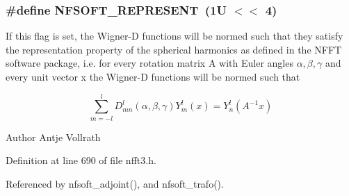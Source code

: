 \hypertarget{group__nfsoft_ga379d5bf88e399cf492d86090ce47d47d}{
\subsubsection[{N\-F\-S\-O\-F\-T\-\_\-\-R\-E\-P\-R\-E\-S\-E\-N\-T}]{\setlength{\rightskip}{0pt plus 5cm}\#define N\-F\-S\-O\-F\-T\-\_\-\-R\-E\-P\-R\-E\-S\-E\-N\-T~(1\-U $<$$<$ 4)}}\label{group__nfsoft_ga379d5bf88e399cf492d86090ce47d47d}
If this flag is set, the Wigner-\/\-D functions will be normed such that they satisfy the representation property of the spherical harmonics as defined in the N\-F\-F\-T software package, i.\-e. for every rotation matrix {\ttfamily A} with Euler angles $\alpha, \beta, \gamma$ and every unit vector {\ttfamily x} the Wigner-\/\-D functions will be normed such that

\[ \sum_{m=-l}^l D_{mn}^l(\alpha,\beta,\gamma) Y_m^l(x) = Y_n^l(A^{-1} x) \]

\begin{DoxyAuthor}{Author}
Antje Vollrath 
\end{DoxyAuthor}


Definition at line 690 of file nfft3.\-h.



Referenced by nfsoft\-\_\-adjoint(), and nfsoft\-\_\-trafo().


